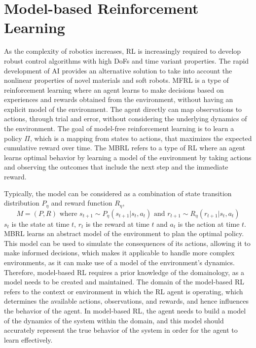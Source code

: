 \section{Model-based Reinforcement Learning}
As the complexity of robotics increases, \ac{RL} is increasingly required to develop robust control algorithms with high \ac{DoF}s and time variant properties\cite{zhangEffectiveSoftRobot2017}. The rapid development of AI provides an alternative solution to take into account the nonlinear properties of novel materials and soft robots\cite{tangModelbasedOnlineLearning2021}. \ac{MFRL} is a type of reinforcement learning where an agent learns to make decisions based on experiences and rewards obtained from the environment, without having an explicit model of the environment. The agent directly can map observations to actions, through trial and error, without considering the underlying dynamics of the environment\cite{arulkumaranDeepReinforcementLearning2017}. The goal of model-free reinforcement learning is to learn a policy $\Pi$, which is a mapping from states to actions, that maximizes the expected cumulative reward over time. The \ac{MBRL} refers to a type of \ac{RL} where an agent learns optimal behavior by learning a model of the environment by taking actions and observing the outcomes that include the next step and the immediate reward\cite{rayModelBasedReinforcementLearning2010}. 


Typically, the model can be considered as a combination of state transition distribution $P_\eta$ and reward function $R_\eta$, $$M = (P,R) \textrm{ where } s_{t+1}\sim P_\eta(s_{t+1}|s_t, a_t) \textrm{ and } r_{t+1}\sim R_\eta(r_{t+1}|s_t, a_t)$$ $s_t$ is the state at time $t$, $r_t$ is the reward at time $t$ and $a_t$ is the action at time $t$. \ac{MBRL} learns an abstract model of the environment to plan the optimal policy. This model can be used to simulate the consequences of its actions, allowing it to make informed decisions, which makes it applicable to handle more complex environments, as it can make use of a model of the environment's dynamics. Therefore, model-based \ac{RL} requires a prior knowledge of the domainology\cite{tangModelbasedOnlineLearning2021}, as a model needs to be created and maintained. The domain of the model-based \ac{RL} refers to the context or environment in which the \ac{RL} agent is operating, which determines the available actions, observations, and rewards, and hence influences the behavior of the agent\cite{langExplorationRelationalDomains}. In model-based \ac{RL}, the agent needs to build a model of the dynamics of the system within the domain, and this model should accurately represent the true behavior of the system in order for the agent to learn effectively.
